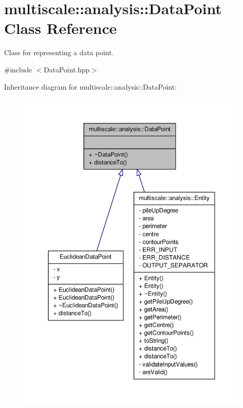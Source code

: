 \hypertarget{classmultiscale_1_1analysis_1_1DataPoint}{\section{multiscale\-:\-:analysis\-:\-:\-Data\-Point \-Class \-Reference}
\label{classmultiscale_1_1analysis_1_1DataPoint}
}


\-Class for representing a data point.  




{\ttfamily \#include $<$\-Data\-Point.\-hpp$>$}



\-Inheritance diagram for multiscale\-:\-:analysis\-:\-:\-Data\-Point\-:
\nopagebreak
\begin{figure}[H]
\begin{center}
\leavevmode
\includegraphics[width=350pt]{classmultiscale_1_1analysis_1_1DataPoint__inherit__graph}
\end{center}
\end{figure}
